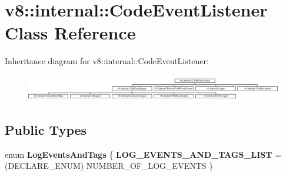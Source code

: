 \hypertarget{classv8_1_1internal_1_1CodeEventListener}{}\section{v8\+:\+:internal\+:\+:Code\+Event\+Listener Class Reference}
\label{classv8_1_1internal_1_1CodeEventListener}
Inheritance diagram for v8\+:\+:internal\+:\+:Code\+Event\+Listener\+:\begin{figure}[H]
\begin{center}
\leavevmode
\includegraphics[height=1.161826cm]{classv8_1_1internal_1_1CodeEventListener}
\end{center}
\end{figure}
\subsection*{Public Types}
\begin{DoxyCompactItemize}
\item 
\mbox{\label{classv8_1_1internal_1_1CodeEventListener_af5ce5b06d8c39ad93f78192d34081a15}} 
enum {\bfseries Log\+Events\+And\+Tags} \{ {\bfseries L\+O\+G\+\_\+\+E\+V\+E\+N\+T\+S\+\_\+\+A\+N\+D\+\_\+\+T\+A\+G\+S\+\_\+\+L\+I\+ST} =(D\+E\+C\+L\+A\+R\+E\+\_\+\+E\+N\+UM) N\+U\+M\+B\+E\+R\+\_\+\+O\+F\+\_\+\+L\+O\+G\+\_\+\+E\+V\+E\+N\+TS
 \}
\end{DoxyCompactItemize}
